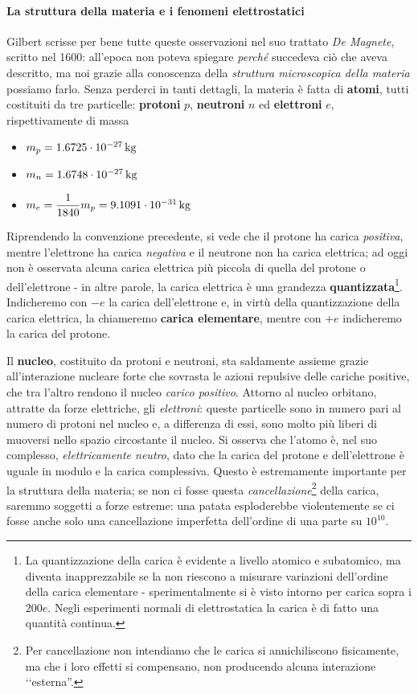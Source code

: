 \paragraph{La struttura della materia e i fenomeni elettrostatici}
Gilbert scrisse per bene tutte queste osservazioni nel suo trattato \textit{De Magnete}, scritto nel 1600: all'epoca non poteva spiegare \textit{perché} succedeva ciò che aveva descritto, ma noi grazie alla conoscenza della \textit{struttura microscopica della materia} possiamo farlo. Senza perderci in tanti dettagli, la materia è fatta di \textbf{atomi}, tutti costituiti da tre particelle: \textbf{protoni} $p$, \textbf{neutroni} $n$ ed \textbf{elettroni} $e$, rispettivamente di massa
\begin{itemize}
	\item $m_p = \SI[exponent-product=\ensuremath{\cdot}]{1.6725d-27}{\kilogram}$ 
	\item $m_n = \SI[exponent-product=\ensuremath{\cdot}]{1.6748d-27}{\kilogram}$
	\item $m_e = \dfrac{1}{1840}m_p=\SI[exponent-product=\ensuremath{\cdot}]{9,1091d-31}{\kilogram}$
\end{itemize}
Riprendendo la convenzione precedente, si vede che il protone ha carica \textit{positiva}, mentre l'elettrone ha carica \textit{negativa} e il neutrone non ha carica elettrica; ad oggi non è osservata alcuna carica elettrica più piccola di quella del protone o dell'elettrone - in altre parole, la carica elettrica è una grandezza \textbf{quantizzata}\footnote{La quantizzazione della carica è evidente a livello atomico e subatomico, ma diventa inapprezzabile se la non riescono a misurare variazioni dell'ordine della carica elementare - sperimentalmente si è visto intorno per carica sopra i $200 e$. Negli esperimenti normali di elettrostatica la carica è di fatto una quantità continua.}. Indicheremo con $-e$ la carica dell'elettrone e, in virtù della quantizzazione della carica elettrica, la chiameremo \textbf{carica elementare}, mentre con $+e$ indicheremo la carica del protone.

Il \textbf{nucleo}, costituito da protoni e neutroni, sta saldamente assieme grazie all'interazione nucleare forte che sovrasta le azioni repulsive delle cariche positive, che tra l'altro rendono il nucleo \textit{carico positivo}. Attorno al nucleo orbitano, attratte da forze elettriche, gli \textit{elettroni}: queste particelle sono in numero pari al numero di protoni nel nucleo e, a differenza di essi, sono molto più liberi di muoversi nello spazio circostante il nucleo. Si osserva che l'atomo è, nel suo complesso, \textit{elettricamente neutro}, dato che la carica del protone e dell'elettrone è uguale in modulo e la carica complessiva. Questo è estremamente importante per la struttura della materia; se non ci fosse questa \textit{cancellazione}\footnote{Per cancellazione non intendiamo che le carica si annichiliscono fisicamente, ma che i loro effetti si compensano, non producendo alcuna interazione ‘‘esterna''.} della carica, saremmo soggetti a forze estreme: una patata esploderebbe violentemente se ci fosse anche solo una cancellazione imperfetta dell'ordine di una parte su $10^10$.

